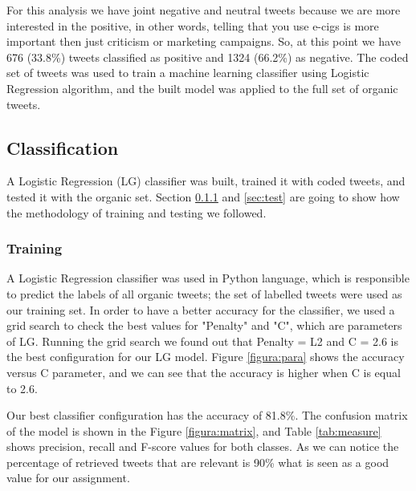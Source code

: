 \documentclass{sig-alternate}
\begin{document}
 
For this analysis we have joint negative and neutral tweets because we are more interested in the positive, in other words, telling that you use e-cigs is more important then just criticism or marketing campaigns. So, at this point we have 676 (33.8\%) tweets classified as positive and 1324 (66.2\%) as negative. The coded set of tweets was used to train a machine learning classifier using Logistic Regression algorithm, and the built model was applied to the full set of organic tweets.


\subsection{Classification}

A Logistic Regression (LG) classifier was built, trained it with coded tweets, and tested it with the organic set. Section \ref{sec:train} and \ref{sec:test} are going to show how the methodology of training and testing we followed.

\subsubsection{Training}
\label{sec:train}

A Logistic Regression classifier was used in Python language, which is responsible to predict the labels of all organic tweets; the set of labelled tweets were used as our training set. In order to have a better accuracy for the classifier, we used a grid search to check the best values for "Penalty" and "C", which are parameters of LG. Running the grid search we found out that Penalty = L2 and C = 2.6 is the best configuration for our LG model. Figure \ref{figura:para} shows the accuracy versus C parameter, and we can see that the accuracy is higher when C is equal to 2.6.


Our best classifier configuration has the accuracy of 81.8\%. The confusion matrix of the model is shown in the Figure \ref{figura:matrix}, and Table \ref{tab:measure} shows precision, recall and F-score values for both classes. As we can notice the percentage of retrieved tweets that are relevant is 90\% what is seen as a good value for our assignment.


\end{document}

